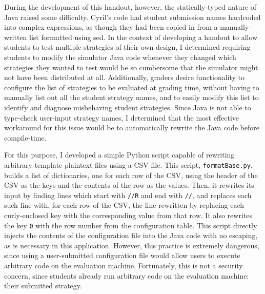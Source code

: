 \documentclass[pageno]{jpaper}
\begin{document}
During the development of this handout, however, the statically-typed nature of Java raised some difficulty.
Cyril's code had student submission names hardcoded into complex expressions, as though they had been copied in from a manually-written list formatted using sed.
In the context of developing a handout to allow students to test multiple strategies of their own design, I determined requiring students to modify the simulator Java code whenever they changed which strategies they wanted to test would be so cumbersome that the simulator might not have been distributed at all.
Additionally, graders desire functionality to configure the list of strategies to be evaluated at grading time, without having to manually list out all the student strategy names, and to easily modify this list to identify and diagnose misbehaving student strategies.
Since Java is not able to type-check user-input strategy names, I determined that the most effective workaround for this issue would be to automatically rewrite the Java code before compile-time.

For this purpose, I developed a simple Python script capable of rewriting arbitrary template plaintext files using a CSV file.
This script, \texttt{formatBase.py}, builds a list of dictionaries, one for each row of the CSV, using the header of the CSV as the keys and the contents of the row as the values.
Then, it rewrites its input by finding lines which start with \texttt{//R} and end with \texttt{//}, and replaces each such line with, for each row of the CSV, the line rewritten by replacing each curly-enclosed key with the corresponding value from that row.
It also rewrites the key \texttt{0} with the row number from the configuration table.
This script directly injects the contents of the configuration file into the Java code with no escaping, as is necessary in this application.
However, this practice is extremely dangerous, since using a user-submitted configuration file would allow users to execute arbitrary code on the evaluation machine.
Fortunately, this is not a security concern, since students already run arbitrary code on the evaluation machine: their submitted strategy.
\end{document}

